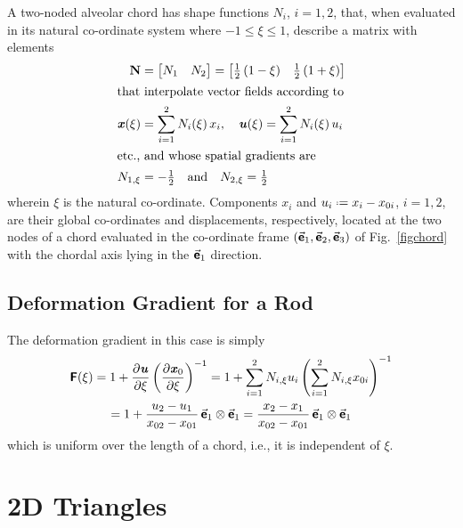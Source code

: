 A two-noded alveolar chord has shape functions $N_i$, $i=1,2$, that, when evaluated in its natural co-ordinate system where $-1 \leq \xi \leq 1$, describe a matrix with elements
\begin{subequations}
    \label{shapeFnsChord}
    \begin{align}
\mathbf{N} & = \begin{bmatrix} N_1 & N_2 \end{bmatrix} =
\begin{bmatrix}
\frac{1}{2} \, (1 - \xi) &  \frac{1}{2} \, (1 + \xi)
\end{bmatrix} \\
\intertext{that interpolate vector fields according to}
\boldsymbol{\mathit{x}} ( \xi ) & = \sum_{i=1}^2 N_i ( \xi ) \, x_i , \quad
\boldsymbol{\mathit{u}} ( \xi ) = \sum_{i=1}^2 N_i ( \xi ) \, u_i  \\
\intertext{etc., and whose spatial gradients are} 
N_{1,\xi} & = -\tfrac{1}{2} 
\quad \text{and} \quad
N_{2,\xi} = \tfrac{1}{2}
\end{align}
\end{subequations}
wherein $\xi$ is the natural co-ordinate.  Components $x_i$ and $u_i \defeq x_i - x_{0i}$, $i=1,2$, are their global co-ordinates and displacements, respectively, located at the two nodes of a chord evaluated in the co-ordinate frame $( \vec{\boldsymbol{\mathsf{e}}}_1 , \vec{\boldsymbol{\mathsf{e}}}_2 , \vec{\boldsymbol{\mathsf{e}}}_3 )$ of Fig.~\ref{figchord} with the chordal axis lying in the $\vec{\boldsymbol{\mathsf{e}}}_1$ direction.

\subsection{Deformation Gradient for a Rod}

The deformation gradient in this case is simply
\begin{multline}
    \boldsymbol{\mathsf{F}} ( \xi ) = 1 + \frac{\partial \boldsymbol{\mathit{u}}}{\partial \xi} 
    \left( \frac{\partial \boldsymbol{\mathit{x}}_0 }{\partial \xi} \right)^{-1} = 
    1 + \sum_{i=1}^2 N_{i,\xi} u_i \left( \sum_{i=1}^2 N_{i,\xi} x_{0i} \right)^{-1} \\
    = 1 + \frac{u_2 - u_1}{x_{02} - x_{01}} \, \vec{\boldsymbol{\mathsf{e}}}_1 \otimes \vec{\boldsymbol{\mathsf{e}}}_1 = \frac{x_2 - x_1}{x_{02} - x_{01}} \, \vec{\boldsymbol{\mathsf{e}}}_1 \otimes \vec{\boldsymbol{\mathsf{e}}}_1
\end{multline}
which is uniform over the length of a chord, i.e., it is independent of $\xi$.

\section{2D Triangles}

